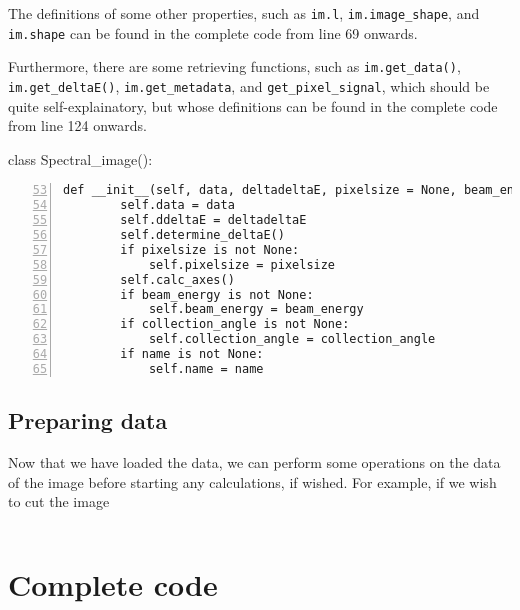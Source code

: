 \documentclass{article}
\begin{document}
The definitions of some other properties, such as \verb|im.l|, \verb|im.image_shape|, and \verb|im.shape| can be found in the complete code from line 69 onwards.

Furthermore, there are some retrieving functions, such as \verb|im.get_data()|, \verb|im.get_deltaE()|, \verb|im.get_metadata|, and \verb|get_pixel_signal|, which should be quite self-explainatory, but whose definitions can be found in the complete code from line 124 onwards.



\begin{python3}[numbers=left, firstnumber=41]
class Spectral_image():
\end{python3}
%
\begin{lstlisting}[numbers=left, firstnumber=53]
    def __init__(self, data, deltadeltaE, pixelsize = None, beam_energy = None, collection_angle = None, name = None):
        self.data = data
        self.ddeltaE = deltadeltaE
        self.determine_deltaE()
        if pixelsize is not None:
            self.pixelsize = pixelsize
        self.calc_axes()
        if beam_energy is not None:
            self.beam_energy = beam_energy
        if collection_angle is not None:
            self.collection_angle = collection_angle
        if name is not None:
            self.name = name
\end{lstlisting}

\subsection{Preparing data}
Now that we have loaded the data, we can perform some operations on the data of the image before starting any calculations, if wished. For example, if we wish to cut the image 

%
\begin{lstlisting}[numbers=left, firstnumber=1]
\end{lstlisting}

\section{Complete code}
%
\end{document}
